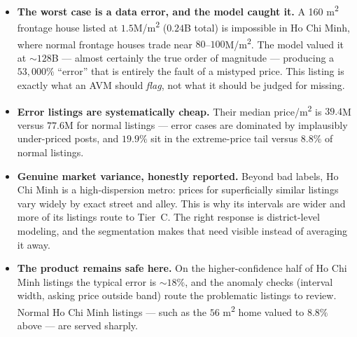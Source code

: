 \documentclass[11pt]{article}
\newcommand{\pct}{\%}
\begin{document}
\begin{itemize}
  \item \textbf{The worst case is a data error, and the model caught it.} A 160 m\textsuperscript{2}
        frontage house listed at $1.5$M/m\textsuperscript{2} ($0.24$B total) is impossible in Ho Chi
        Minh, where normal frontage houses trade near $80$--$100$M/m\textsuperscript{2}. The model
        valued it at $\sim 128$B --- almost certainly the true order of magnitude --- producing a
        $53{,}000\pct$ ``error'' that is entirely the fault of a mistyped price. This listing is
        exactly what an AVM should \emph{flag}, not what it should be judged for missing.
  \item \textbf{Error listings are systematically cheap.} Their median price/m\textsuperscript{2} is
        $39.4$M versus $77.6$M for normal listings --- error cases are dominated by implausibly
        under-priced posts, and $19.9\pct$ sit in the extreme-price tail versus $8.8\pct$ of normal
        listings.
  \item \textbf{Genuine market variance, honestly reported.} Beyond bad labels, Ho Chi Minh is a
        high-dispersion metro: prices for superficially similar listings vary widely by exact
        street and alley. This is why its intervals are wider and more of its listings route to
        Tier~C. The right response is district-level modeling, and the segmentation makes that need
        visible instead of averaging it away.
  \item \textbf{The product remains safe here.} On the higher-confidence half of Ho Chi Minh
        listings the typical error is $\sim 18\pct$, and the anomaly checks (interval width, asking
        price outside band) route the problematic listings to review. Normal Ho Chi Minh listings ---
        such as the $56$ m\textsuperscript{2} home valued to $8.8\pct$ above --- are served sharply.
\end{itemize}

\end{document}
